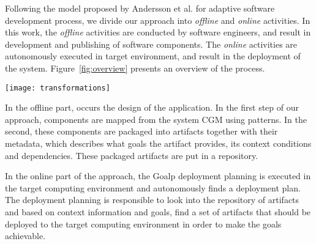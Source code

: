 \label{sec:proposal}



Following the model proposed by Andersson et al.\cite{andersson_software_2013} for adaptive software development process, we divide our approach into \emph{offline} and \emph{online} activities. In this work, the \emph{offline} activities are conducted by software engineers, and result in development and publishing of software components. The \emph{online} activities are autonomously executed in target environment, and result in the deployment of the system. Figure~\ref{fig:overview} presents an overview of the process.

\begin{figure*}[!htb]
  \centering
  \texttt{[image: transformations]}
  \caption{Activities: (1) component mapping; (2) packaging; (3) deployment planning; (4) component binding}
\label{fig:overview}
\end{figure*}


In the offline part, occurs the design of the application. In the first step of our approach, components are mapped from the system CGM using patterns. In the second, these components are packaged into artifacts together with their metadata, which describes what goals the artifact provides, its context conditions and dependencies. These packaged artifacts are put in a repository.

In the online part of the approach, the Goalp deployment planning is executed in the target computing environment and autonomously finds a deployment plan.
The deployment planning is responsible to look into the repository of artifacts and based on context information and goals, find a set of artifacts that should be deployed to the target computing environment in order to make the goals achievable.

